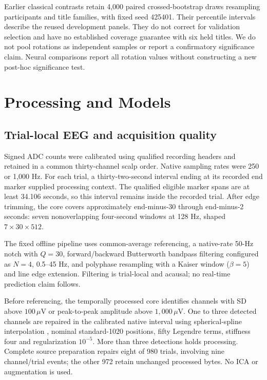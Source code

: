 \documentclass[conference]{IEEEtran}
\begin{document}
Earlier classical contrasts retain 4,000 paired crossed-bootstrap draws resampling participants and title families, with fixed seed 425401. Their percentile intervals describe the reused development panels. They do not correct for validation selection and have no established coverage guarantee with six held titles. We do not pool rotations as independent samples or report a confirmatory significance claim. Neural comparisons report all rotation values without constructing a new post-hoc significance test.

\section{Processing and Models}
\subsection{Trial-local EEG and acquisition quality}
Signed ADC counts were calibrated using qualified recording headers and retained in a common thirty-channel scalp order. Native sampling rates were 250 or 1,000 Hz. For each trial, a thirty-two-second interval ending at its recorded end marker supplied processing context. The qualified eligible marker spans are at least 34.106 seconds, so this interval remains inside the recorded trial. After edge trimming, the core covers approximately end-minus-30 through end-minus-2 seconds: seven nonoverlapping four-second windows at 128 Hz, shaped \(7\times30\times512\).

The fixed offline pipeline uses common-average referencing, a native-rate 50-Hz notch with \(Q=30\), forward/backward Butterworth bandpass filtering configured as \(N=4\), 0.5--45 Hz, and polyphase resampling with a Kaiser window (\(\beta=5\)) and line edge extension. Filtering is trial-local and acausal; no real-time prediction claim follows.

Before referencing, the temporally processed core identifies channels with SD above \(100\,\mu\mathrm{V}\) or peak-to-peak amplitude above \(1{,}000\,\mu\mathrm{V}\). One to three detected channels are repaired in the calibrated native interval using spherical-spline interpolation \cite{perrin1989spherical}, nominal standard-1020 positions, fifty Legendre terms, stiffness four and regularization \(10^{-5}\). More than three detections holds processing. Complete source preparation repairs eight of 980 trials, involving nine channel/trial events; the other 972 retain unchanged processed bytes. No ICA or augmentation is used.
\end{document}
